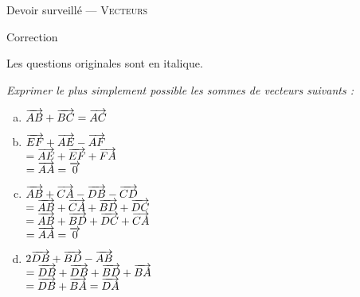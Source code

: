 \documentclass[11pt]{article}
\begin{document}
\begin{center}
  {\large
    Devoir surveillé
    ---
    \textsc{Vecteurs}
  }

  Correction
\end{center}

\begin{em}
  \noindent Les questions originales sont en italique.
\end{em}


\begin{exercice} \emph{Exprimer le plus
  simplement possible les sommes de vecteurs suivants :}
  \begin{multicols}{2}
    \begin{enumerate}[(a)]
      \item $\overrightarrow{AB}+\overrightarrow{BC} = \overrightarrow{AC}$
      \item $\overrightarrow{EF}+\overrightarrow{AE}-\overrightarrow{AF}$\\
        $= \overrightarrow{AE}+\overrightarrow{EF} + \overrightarrow{FA}$ \\
        $= \overrightarrow{AA} = \overrightarrow{0}$
      \columnbreak
      \item $\overrightarrow{AB}+\overrightarrow{CA}-\overrightarrow{DB}-\overrightarrow{CD}$\\
        $= \overrightarrow{AB} + \overrightarrow{CA} + \overrightarrow{BD} + \overrightarrow{DC}$\\
        $= \overrightarrow{AB} + \overrightarrow{BD} + \overrightarrow{DC} + \overrightarrow{CA}$\\
        $= \overrightarrow{AA} = \overrightarrow{0}$
      \item $2\overrightarrow{DB}+\overrightarrow{BD}-\overrightarrow{AB}$\\
        $= \overrightarrow{DB} + \overrightarrow{DB} + \overrightarrow{BD} + \overrightarrow{BA}$\\
        $= \overrightarrow{DB} + \overrightarrow{BA} = \overrightarrow{DA}$
    \end{enumerate}
  \end{multicols}
\end{exercice}
\end{document}
